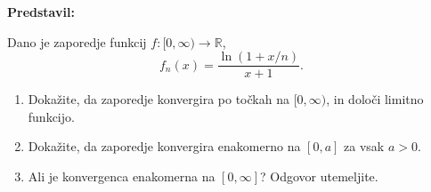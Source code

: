 \textbf{Predstavil: }

Dano je zaporedje funkcij $f: [0, \infty) \to \mathbb{R}$, \[f_{n}(x) = \frac{\ln(1+x/n)}{x+1}.\]
\begin{enumerate}
  \item Dokažite, da zaporedje konvergira po točkah na $[0, \infty)$, in določi limitno funkcijo.
  \item Dokažite, da zaporedje konvergira enakomerno na $[0,a]$ za vsak $a > 0$.
  \item Ali je konvergenca enakomerna na $[0, \infty]$? Odgovor utemeljite.
\end{enumerate}